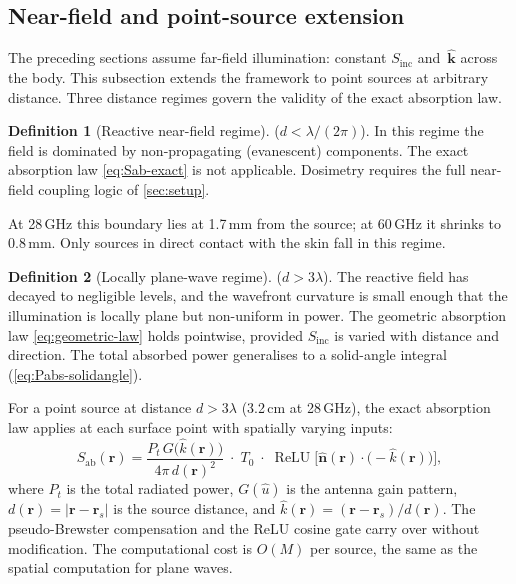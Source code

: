 \documentclass[11pt,a4paper]{article}
\theoremstyle{definition}      %
\newtheorem{definition}[definition]{Definition}
\newcommand{\khat}{\hat{\bm{k}}}
\newcommand{\nhat}{\hat{\bm{n}}}
\newcommand{\rr}{\mathbf{r}}
\newcommand{\Sinc}{S_{\mathrm{inc}}}
\newcommand{\Sab}{S_{\mathrm{ab}}}
\DeclareMathOperator{\ReLU}{ReLU}
\begin{document}
\subsection{Near-field and point-source extension}\label{sec:near-field}

The preceding sections assume far-field illumination: constant
$\Sinc$ and~$\khat$ across the body.  This subsection extends the
framework to point sources at arbitrary distance.  Three distance
regimes govern the validity of the exact absorption law.

\begin{definition}[Reactive near-field regime]
($d < \lambda/(2\pi)$).  In this regime the field is dominated by
non-propagating (evanescent) components.  The exact absorption law
\cref{eq:Sab-exact} is not applicable.  Dosimetry requires the full
near-field coupling logic of \cref{sec:setup}.

At 28\,GHz this boundary lies at 1.7\,mm from the
source; at 60\,GHz it shrinks to 0.8\,mm.  Only sources in direct
contact with the skin fall in this regime.
\end{definition}

\begin{definition}[Locally plane-wave regime]
($d > 3\lambda$).  The reactive field has decayed to negligible
levels, and the wavefront curvature is small enough that the
illumination is locally plane but non-uniform in power.  The
geometric absorption law \cref{eq:geometric-law} holds pointwise, provided $\Sinc$
is varied with distance and direction.  The total absorbed power
generalises to a solid-angle integral (\cref{eq:Pabs-solidangle}).

For a point source at distance $d > 3\lambda$ (3.2\,cm at 28\,GHz), the
exact absorption law applies at each surface point with spatially
varying inputs:
\begin{equation}\label{eq:Sab-point}
  \Sab(\rr)
  = \frac{P_t\,G\!\bigl(\hat{k}(\rr)\bigr)}{4\pi\,d(\rr)^2}
    \;\cdot\; T_0\;\cdot\;
    \ReLU\!\bigl[\nhat(\rr)\cdot\bigl(-\hat{k}(\rr)\bigr)\bigr],
\end{equation}
where $P_t$ is the total radiated power, $G(\hat{u})$ is the antenna
gain pattern, $d(\rr)=|\rr-\rr_s|$ is the source distance, and
$\hat{k}(\rr)=(\rr-\rr_s)/d(\rr)$.  The pseudo-Brewster
compensation and the ReLU cosine gate carry over without
modification.  The computational cost is $O(M)$ per source, the
same as the spatial computation for plane waves.
\end{definition}
\end{document}
